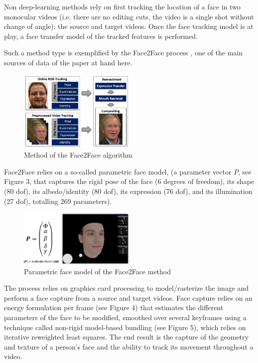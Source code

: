 \documentclass{article} %
\begin{document}
Non deep-learning methods rely on first tracking the location of a face in two monocular videos (i.e. there are no editing cuts, the video is a single shot without change of angle): the source and target videos. Once the face tracking model is at play, a face transfer model of the tracked features is performed.

Such a method type is exemplified by the Face2Face process \citep{Thies2018Face2Face}, one of the main sources of data of the paper at hand here. 

\begin{figure}[H]
\begin{center}
\includegraphics[width=0.5\textwidth]{images/method.png}
\end{center}
\caption{Method of the Face2Face algorithm \citep{Thies2018Face2Face}}
\end{figure}

Face2Face relies on a so-called parametric face model, (a parameter vector $P$, see Figure 3, that captures the rigid pose of the face (6 degrees of freedom), its shape (80 dof), its albedo/identity (80 dof), its expression (76 dof), and its illumination (27 dof), totalling 269 parameters).

\begin{figure}[H]
\begin{center}
\includegraphics[width=0.5\textwidth]{images/parametric.png}
\end{center}
\caption{Parametric face model of the Face2Face method \citep{Thies2016}}
\end{figure}

The process relies on graphics card processing to model/rasterize the image and perform a face capture from a source and target videos. Face capture relies on an energy formulation per frame (see Figure 4) that estimates the different parameters of the face to be modified, smoothed over several keyframes using a technique called non-rigid model-based bundling (see Figure 5), which relies on iterative reweighted least squares. The end result is the capture of the geometry and texture of a person's face and the ability to track its movement throughout a video.
\end{document}
